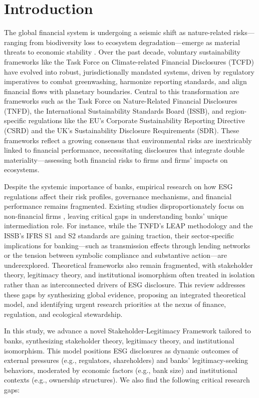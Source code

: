 \documentclass[
  authoryear]{elsarticle}
\begin{document}
\section{Introduction}\label{introduction}

The global financial system is undergoing a seismic shift as
nature-related risks---ranging from biodiversity loss to ecosystem
degradation---emerge as material threats to economic stability
\citep{UNEP2023}. Over the past decade, voluntary sustainability
frameworks like the Task Force on Climate-related Financial Disclosures
(TCFD) have evolved into robust, jurisdictionally mandated systems,
driven by regulatory imperatives to combat greenwashing, harmonize
reporting standards, and align financial flows with planetary
boundaries. Central to this transformation are frameworks such as the
Task Force on Nature-Related Financial Disclosures (TNFD), the
International Sustainability Standards Board (ISSB), and region-specific
regulations like the EU's Corporate Sustainability Reporting Directive
(CSRD) and the UK's Sustainability Disclosure Requirements (SDR). These
frameworks reflect a growing consensus that environmental risks are
inextricably linked to financial performance, necessitating disclosures
that integrate double materiality---assessing both financial risks to
firms and firms' impacts on ecosystems.

Despite the systemic importance of banks, empirical research on how ESG
regulations affect their risk profiles, governance mechanisms, and
financial performance remains fragmented. Existing studies
disproportionately focus on non-financial firms
\citep[e.g.][]{YOUN2015, FAVINO2019, BUALLAY2019, DYCK2019}, leaving
critical gaps in understanding banks' unique intermediation role. For
instance, while the TNFD's LEAP methodology and the ISSB's IFRS S1 and
S2 standards are gaining traction, their sector-specific implications
for banking---such as transmission effects through lending networks or
the tension between symbolic compliance and substantive action---are
underexplored. Theoretical frameworks also remain fragmented, with
stakeholder theory, legitimacy theory, and institutional isomorphism
often treated in isolation rather than as interconnected drivers of ESG
disclosure. This review addresses these gaps by synthesizing global
evidence, proposing an integrated theoretical model, and identifying
urgent research priorities at the nexus of finance, regulation, and
ecological stewardship.

In this study, we advance a novel Stakeholder-Legitimacy Framework
\citep{CAMPBELL2007, AGUINIS2012} tailored to banks, synthesizing
stakeholder theory, legitimacy theory, and institutional isomorphism.
This model positions ESG disclosures as dynamic outcomes of external
pressures (e.g., regulators, shareholders) and banks' legitimacy-seeking
behaviors, moderated by economic factors (e.g., bank size) and
institutional contexts (e.g., ownership structures). We also find the
following critical research gaps:
\end{document}

